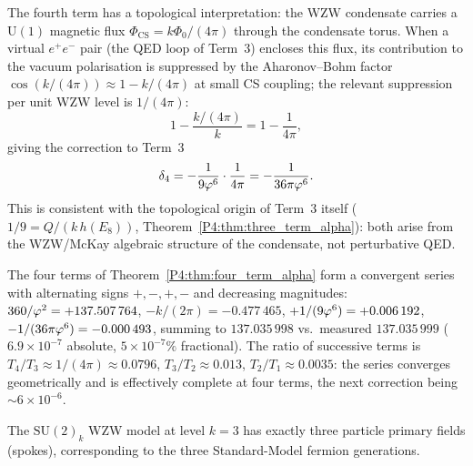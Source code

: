 \begin{remark}
\label{P4:rem:cs_correction}
The fourth term has a topological interpretation: the WZW condensate
carries a $\mathrm{U}(1)$ magnetic flux $\Phi_{\mathrm{CS}}=k\Phi_0/(4\pi)$
through the condensate torus. When a virtual $e^+e^-$ pair (the QED loop
of Term~3) encloses this flux, its contribution to the vacuum polarisation
is suppressed by the Aharonov--Bohm factor $\cos(k/(4\pi))\approx1-k/(4\pi)$
at small CS coupling; the relevant suppression per unit WZW level is
$1/(4\pi)$:
\begin{equation}
  1 - \frac{k/(4\pi)}{k} = 1-\frac{1}{4\pi},
  \label{P4:eq:cs_factor}
\end{equation}
giving the correction to Term~3
\begin{equation}
  \delta_4 = -\frac{1}{9\varphi^6}\cdot\frac{1}{4\pi} = -\frac{1}{36\pi\varphi^6}.
  \label{P4:eq:term4}
\end{equation}
This is
consistent with the topological origin of Term~3 itself
($1/9=Q/(k\,h(E_8))$, Theorem~\ref{P4:thm:three_term_alpha}): both arise from
the WZW/McKay algebraic structure of the condensate, not perturbative QED.
\end{remark}

\begin{remark}
\label{P4:rem:four_term_series}
The four terms of Theorem~\ref{P4:thm:four_term_alpha} form a convergent
series with alternating signs $+,-,+,-$ and decreasing magnitudes:
$360/\varphi^2=+137.507\,764$, $-k/(2\pi)=-0.477\,465$,
$+1/(9\varphi^6)=+0.006\,192$, $-1/(36\pi\varphi^6)=-0.000\,493$, summing to
$137.035\,998$ vs.\ measured $137.035\,999$ ($6.9\times10^{-7}$ absolute,
$5\times10^{-7}\%$ fractional). The ratio of successive terms is
$T_4/T_3\approx1/(4\pi)\approx0.0796$, $T_3/T_2\approx0.013$,
$T_2/T_1\approx0.0035$: the series converges geometrically and is
effectively complete at four terms, the next correction being
$\sim6\times10^{-6}$.
\end{remark}

\begin{theorem}
\label{P4:thm:three_gen}
The $\mathrm{SU}(2)_k$ WZW model at level $k=3$ has exactly three
particle primary fields (spokes), corresponding to the three
Standard-Model fermion generations.
\end{theorem}


